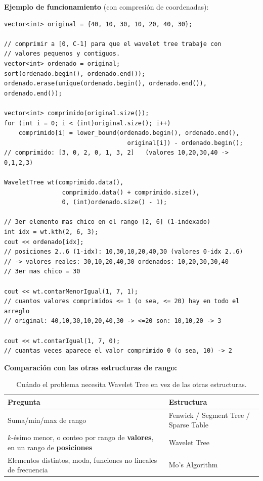 \documentclass[10pt,a4paper,twocolumn]{article}
\begin{document}
\textbf{Ejemplo de funcionamiento} (con compresión de coordenadas):

\begin{lstlisting}[style=cpp]
vector<int> original = {40, 10, 30, 10, 20, 40, 30};

// comprimir a [0, C-1] para que el wavelet tree trabaje con
// valores pequenos y contiguos.
vector<int> ordenado = original;
sort(ordenado.begin(), ordenado.end());
ordenado.erase(unique(ordenado.begin(), ordenado.end()), ordenado.end());

vector<int> comprimido(original.size());
for (int i = 0; i < (int)original.size(); i++)
    comprimido[i] = lower_bound(ordenado.begin(), ordenado.end(),
                                  original[i]) - ordenado.begin();
// comprimido: [3, 0, 2, 0, 1, 3, 2]   (valores 10,20,30,40 -> 0,1,2,3)

WaveletTree wt(comprimido.data(),
                comprimido.data() + comprimido.size(),
                0, (int)ordenado.size() - 1);

// 3er elemento mas chico en el rango [2, 6] (1-indexado)
int idx = wt.kth(2, 6, 3);
cout << ordenado[idx];
// posiciones 2..6 (1-idx): 10,30,10,20,40,30 (valores 0-idx 2..6)
// -> valores reales: 30,10,20,40,30 ordenados: 10,20,30,30,40
// 3er mas chico = 30

cout << wt.contarMenorIgual(1, 7, 1);
// cuantos valores comprimidos <= 1 (o sea, <= 20) hay en todo el arreglo
// original: 40,10,30,10,20,40,30 -> <=20 son: 10,10,20 -> 3

cout << wt.contarIgual(1, 7, 0);
// cuantas veces aparece el valor comprimido 0 (o sea, 10) -> 2
\end{lstlisting}

\textbf{Comparación con las otras estructuras de rango:}

\begin{table}[H]
\raggedright
\scriptsize
\setlength{\tabcolsep}{3pt}
\begin{tabular}{|p{3.3cm}|p{3.3cm}|}
\hline
\textbf{Pregunta} & \textbf{Estructura} \\
\hline
Suma/min/max de rango & Fenwick / Segment Tree / Sparse Table \\
\hline
$k$-ésimo menor, o conteo por rango de \textbf{valores}, en un rango de \textbf{posiciones} & Wavelet Tree \\
\hline
Elementos distintos, moda, funciones no lineales de frecuencia & Mo's Algorithm \\
\hline
\end{tabular}
\caption{Cuándo el problema necesita Wavelet Tree en vez de las otras estructuras.}
\end{table}
\end{document}
